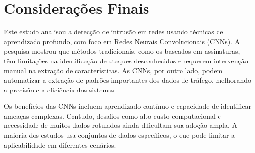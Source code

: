 \documentclass[conference]{IEEEtran}
\begin{document}
  \begin{table*}[!htb]
    \centering
    \caption{Comparação de Trabalhos no Estado-da-Arte}
    \renewcommand{\arraystretch}{1.3} %
    
    \label{tab:sota-overview}
    \end{table*}
    

\section{Considerações Finais}


    Este estudo analisou a detecção de intrusão em redes usando técnicas de aprendizado profundo, com foco em Redes Neurais Convolucionais (CNNs). A pesquisa mostrou que métodos tradicionais, como os baseados em assinaturas, têm limitações na identificação de ataques desconhecidos e requerem intervenção manual na extração de características. As CNNs, por outro lado, podem automatizar a extração de padrões importantes dos dados de tráfego, melhorando a precisão e a eficiência dos sistemas.
    
    Os benefícios das CNNs incluem aprendizado contínuo e capacidade de identificar ameaças complexas. Contudo, desafios como alto custo computacional e necessidade de muitos dados rotulados ainda dificultam sua adoção ampla. A maioria dos estudos usa conjuntos de dados específicos, o que pode limitar a aplicabilidade em diferentes cenários.
    
\end{document}
